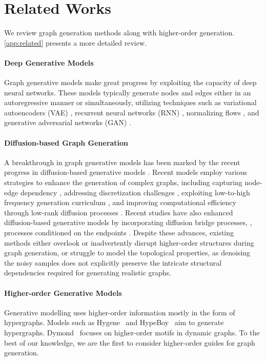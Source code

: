 \section{Related Works}
\vspace{-1mm}
We review graph generation methods along with higher-order generation. \cref{app:related} presents a more detailed review.



\paragraph{Deep Generative Models}
Graph generative models make great progress by exploiting the capacity of deep neural networks. These models typically generate nodes and edges either in an autoregressive manner or simultaneously, utilizing techniques such as variational autoencoders (VAE) \cite{VAE-Jin2018,GraphVAE-DrugDiscovery}, recurrent neural networks (RNN) \cite{GraphRNN2018}, normalizing flows \cite{Moflow-SIGKDD2020,GraphAF-ICLR2020,GraphDF-ICML2021}, and generative adversarial networks (GAN) \cite{GAN1-MolGAN,GAN2-Spectre}.

\paragraph{Diffusion-based Graph Generation}
A breakthrough in graph generative models has been marked by the recent progress in diffusion-based generative models \cite{EDPGNN-2020}.
Recent models employ various strategies to enhance the generation of complex graphs, including capturing node-edge dependency \cite{GDSS+ICML2022}, addressing discretization challenges \cite{DiGress+ICLR2023,CDGS+AAAI2023}, exploiting low-to-high frequency generation curriculum \cite{GPrinFlowNet+ACM2024}, and improving computational efficiency through low-rank diffusion processes \cite{GSDM+TPAMI2023}. 
Recent studies have also enhanced diffusion-based generative models by incorporating diffusion bridge processes, \ie, processes conditioned on the endpoints \cite{wu2022diffusion,GLAD-ICMLworkshop2024,GruM+ICML2024}.
%
Despite these advances, existing methods either overlook or inadvertently disrupt higher-order structures during graph generation, or struggle to model the topological properties, as denoising the noisy samples does not explicitly preserve the intricate structural dependencies required for generating realistic graphs.




\paragraph{Higher-order Generative Models}
Generative modelling uses higher-order information mostly in the form of hypergraphs.
Models such as Hygene~\cite{gailhard2024hygene} and HypeBoy~\cite{kim2024hypeboy} aim to generate hypergraphs. Dymond~\cite{zeno2021dymond} focuses on higher-order motifs in dynamic graphs. 
To the best of our knowledge, we are the first to consider higher-order guides for graph generation.